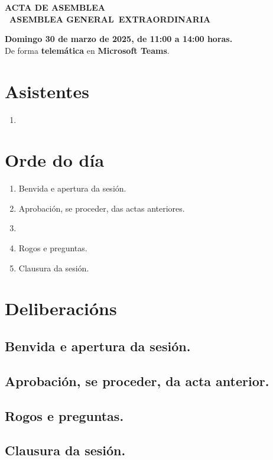 \documentclass[a4paper,12pt]{article}
\newcommand{\assemblyType}{Extraordinaria}
\newcommand{\assemblyDate}{Domingo 30 de marzo de 2025, de 11:00 a 14:00 horas.}
\newcommand{\assemblyPresence}{telemática}
\newcommand{\assemblyUbication}{Microsoft Teams}
\newcommand{\headerSubject}{ACTA DE ASEMBLEA}
\newcommand{\assemblyNumber}{1} %
\newcommand{\assemblyName}{\Romannum{\assemblyNumber}~Asemblea General~\assemblyType}
\newcommand{\subject}{\headerSubject \\ \MakeUppercase{\assemblyName}}
\begin{document}
\begin{center}
    \large \textbf{\subject}
\end{center}

\begin{center}
    \textbf{\assemblyDate}\\
    De forma \textbf{\assemblyPresence} en \textbf{\assemblyUbication}.
\end{center}

\vspace{0.5cm}

\tableofcontents
\newpage
{}

\section{Asistentes}

\begin{multicols}{2}
\begin{enumerate}
    \item[]
\end{enumerate}
\end{multicols}

\section{Orde do día}

\begin{enumerate}
    \item Benvida e apertura da sesión.
    \item Aprobación, se proceder, das actas anteriores.
    \item
    \item Rogos e preguntas.
    \item Clausura da sesión.
\end{enumerate}

\section{Deliberacións}

\subsection{Benvida e apertura da sesión.}

\subsection{Aprobación, se proceder, da acta anterior.}

\subsection{}

\subsection{Rogos e preguntas.}

\subsection{Clausura da sesión.}

\firma
\end{document}
